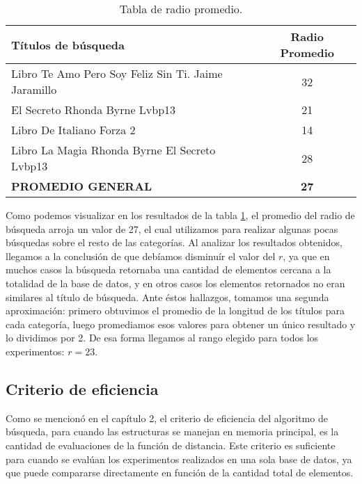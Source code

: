 \begin{table}[H]
\begin{center}
\begin{tabular}{|l|c|}
\hline 
\small T\'itulos de b\'usqueda
&
\small Radio Promedio\\
\hline \hline
\small Libro Te Amo Pero Soy Feliz Sin Ti. Jaime Jaramillo & 32  \\ \hline
\small El Secreto Rhonda Byrne Lvbp13 & 21  \\ \hline
\small Libro De Italiano Forza 2 & 14  \\ \hline
\small Libro La Magia Rhonda Byrne El Secreto Lvbp13 & 28  \\ \hline  \hline
\hspace{4cm}  \textbf{\small PROMEDIO GENERAL} & \textbf{27} \\ \hline
\end{tabular}
\caption{\small Tabla de radio promedio.}
\label{tabla:promedios-rank}
\end{center}
\end{table}

Como podemos visualizar en los resultados de la tabla \ref{tabla:promedios-rank}, el promedio del radio de b\'usqueda arroja un valor de 27, el cual utilizamos para realizar algunas pocas b\'usquedas sobre el resto de las categor\'ias. Al analizar los resultados obtenidos, llegamos a la conclusi\'on de que deb\'iamos disminu\'ir el valor del $r$, ya que en muchos casos la b\'usqueda retornaba una cantidad de elementos cercana a la totalidad de la base de datos, y en otros casos los elementos retornados no eran similares al t\'itulo de b\'usqueda. Ante \'estos hallazgos, tomamos una segunda aproximaci\'on: primero obtuvimos el promedio de la longitud de los t\'itulos para cada categor\'ia, luego promediamos esos valores para obtener un \'unico resultado y lo dividimos por 2.  De esa forma llegamos al rango elegido para todos los experimentos: $r=23$.

\subsection{Criterio de eficiencia}

Como se mencion\'o en el cap\'itulo 2, el criterio de eficiencia del algoritmo de b\'usqueda, para cuando las estructuras se manejan en memoria principal, es la cantidad de evaluaciones de la funci\'on de distancia. Este criterio es suficiente para cuando se eval\'uan los experimentos realizados en una sola base de datos, ya que puede compararse directamente en funci\'on de la cantidad total de elementos.\\

